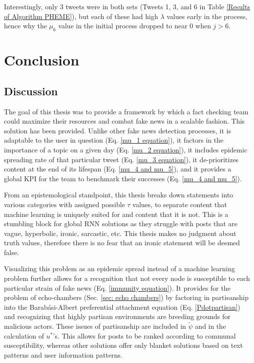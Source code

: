 \documentclass[preprint,review,12pt]{elsarticle}
\begin{document}
Interestingly, only 3 tweets were in both sets (Tweets 1, 3, and 6 in Table \ref{Results of Algorithm PHEME}), but each of these had high $\lambda$ values early in the process, hence why the $\mu_6$ value in the initial process dropped to near 0 when $j > 6$.

\section{Conclusion}
\subsection{Discussion}
The goal of this thesis was to provide a framework by which a fact checking team could maximize their resources and combat fake news in a scalable fashion. This solution has been provided. Unlike other fake news detection processes, it is adaptable to the user in question (Eq. \ref{mu_1 equation}), it factors in the importance of a topic on a given day (Eq. \ref{mu_2 equation}), it includes epidemic spreading rate of that particular tweet (Eq. \ref{mu_3 equation}), it de-prioritizes content at the end of its lifespan (Eq. \ref{mu_4 and mu_5}), and it provides a global KPI for the team to benchmark their successes (Eq. \ref{mu_4 and mu_5}).

From an epistemological standpoint, this thesis breaks down statements into various categories with assigned possible $\tau$ values, to separate content that machine learning is uniquely suited for and content that it is not. This is a stumbling block for global RNN solutions as they struggle with posts that are vague, hyperbolic, ironic, sarcastic, etc. This thesis makes no judgment about truth values, therefore there is no fear that an ironic statement will be deemed false. 

Visualizing this problem as an epidemic spread instead of a machine learning problem further allows for a recognition that not every node is susceptible to each particular strain of fake news (Eq. \ref{immunity equation}). It provides for the problem of echo-chambers (Sec. \ref{sec: echo chambers}) by factoring in partisanship into the Barab{\'a}si-Albert preferential attachment equation (Eq. \ref{Pdotpartisan}) and recognizing that highly partisan environments are breeding grounds for malicious actors. These issues of partisanship are included in $\tilde{\psi}$ and in the calculation of $u^*$'s. This allows for posts to be ranked according to communal susceptibility, whereas other solutions offer only blanket solutions based on text patterns and user information patterns. 
\end{document}
